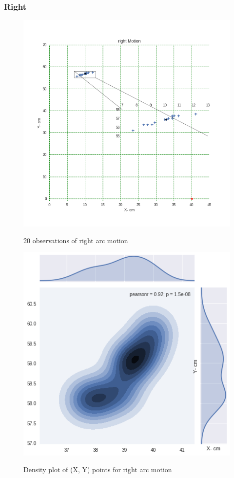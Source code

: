 \documentclass[11pt,a4paper]{article}
\begin{document}
\begin{itemize}
\subsubsection{Right}
\begin{figure}[H]
\centering	
\includegraphics[width=1.2\linewidth]{right_i}
\label{fig:right}
\caption{20 observations of right arc motion}
\end{figure}

\begin{figure}[H]
\centering	
\includegraphics[width=0.8\linewidth]{rightG}
\label{fig:sub1}
\caption{Density plot of (X, Y) points for right arc motion}
\end{figure}


\end{itemize}
\end{document}
